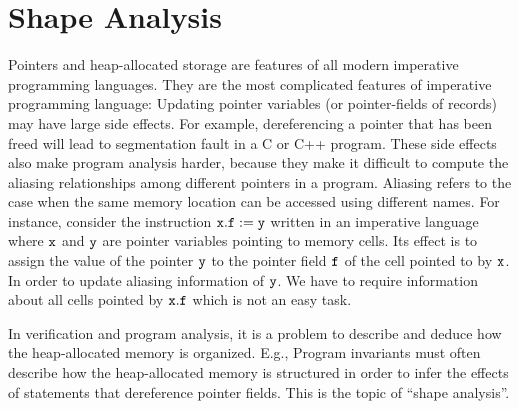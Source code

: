 
\chapter{Shape Analysis}
Pointers and heap-allocated storage are features of all modern imperative programming languages.
They are the most
complicated features of imperative programming language:
Updating  pointer variables (or pointer-fields of records) may have large side effects.
For example, dereferencing a pointer that has been freed will lead to segmentation fault in a C or C++ program.
%
These  side effects also make program analysis harder, because they make it
difficult to compute the  aliasing relationships among different pointers in a program. Aliasing refers to the case  when the same memory location can be accessed using different names.
For instance, consider the instruction  $\tt x.f := y$ written  in an imperative language  where $\tt x$ and $\tt y$ are pointer variables  pointing to memory cells. Its effect is to assign the value of the pointer $\tt y$ to the pointer field $\tt f$  of the cell pointed to by $\tt x$. In order to update aliasing information of $\tt y$. We have to require information about all cells pointed by $\tt x.f$ which is not an easy task.

In verification and program analysis, it is a problem to describe and deduce  how the heap-allocated memory is organized. E.g., Program  invariants must often describe how the heap-allocated memory is structured in order to infer the effects of statements that dereference pointer fields. This is the topic of ``shape analysis''.

